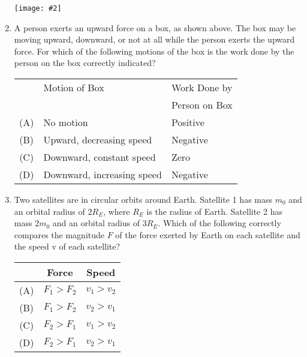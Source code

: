 \documentclass[11pt]{article}
\newcommand{\pic}[2]{\texttt{[image: \#2]}}
\begin{document}
\begin{multicols}{2}
\begin{enumerate}[leftmargin=18pt,resume]
    \begin{center}
      \pic{.1}{push}
    \end{center}
    
  \item A person exerts an upward force on a box, as shown above. The box may be
    moving upward, downward, or not at all while the person exerts the upward
    force. For which of the following motions of the box is the work done by the
    person on the box correctly indicated?

    \begin{tabular}{cll}
      & Motion of Box & Work Done by\\
      &               & Person on Box \\
      \hline
      (A) & No motion                      & Positive \\
      (B) & Upward, decreasing speed   & Negative \\
      (C) & Downward, constant speed   & Zero     \\
      (D) & Downward, increasing speed & Negative
    \end{tabular}
    \columnbreak
    
  \item Two satellites are in circular orbits around Earth. Satellite 1 has
    mass $m_0$ and an orbital radius of $2R_E$, where $R_E$ is the radius of
    Earth. Satellite 2 has mass $2m_0$ and an orbital radius of $3R_E$. Which
    of the following correctly compares the magnitude $F$ of the force exerted
    by Earth on each satellite and the speed v of each satellite?

    \begin{tabular}{ccc}
      & Force & Speed\\
      \hline
      (A)  & $F_1 > F_2$ & $v_1 > v_2$ \\
      (B)  & $F_1 > F_2$ & $v_2 > v_1$ \\
      (C)  & $F_2 > F_1$ & $v_1 > v_2$ \\
      (D)  & $F_2 > F_1$ & $v_2 > v_1$
    \end{tabular}
    

\end{enumerate}
\end{multicols}
\end{document}

